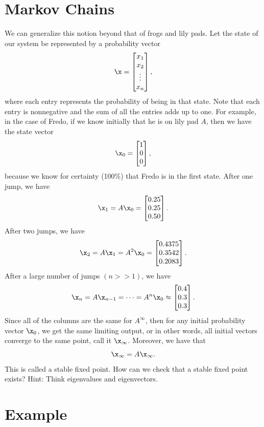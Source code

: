 \section*{Markov Chains}

We can generalize this notion beyond that of frogs and lily pads.  Let the state of our system be represented by a probability vector
\[
\x = \begin{bmatrix}
x_1\\
x_2\\
\vdots\\
x_n
\end{bmatrix},
\]
where each entry represents the probability of being in that state.  Note that each entry is nonnegative and the sum of all the entries adds up to one.  For example, in the case of Fredo, if we know initially that he is on lily pad $A$, then we have the state vector
\[
\x_0 = \begin{bmatrix}
1\\
0\\
0
\end{bmatrix},
\]
because we know for certainty (100\%) that Fredo is in the first state.  After one jump, we have
\[
\x_1 = A \x_0 = \begin{bmatrix}
0.25\\
0.25\\
0.50
\end{bmatrix}.
\]
After two jumps, we have
\[
\x_2 = A \x_1 = A^2 \x_0 = \begin{bmatrix}
0.4375\\
0.3542\\
0.2083
\end{bmatrix}.
\]
After a large number of jumps $(n>>1)$, we have
\[
\x_n = A \x_{n-1} = \dots = A^n \x_0 \approx \begin{bmatrix}
0.4\\
0.3\\
0.3
\end{bmatrix}.
\]
Since all of the columns are the same for $A^\infty$, then for any initial probability vector $\x_0$, we get the same limiting output, or in other words, all initial vectors converge to the same point, call it $\x_\infty$.  Moreover, we have that
\[
\x_\infty = A \x_\infty.
\]
This is called a stable fixed point.  How can we check that a stable fixed point exists?  Hint: Think eigenvalues and eigenvectors.

\section*{Example}

